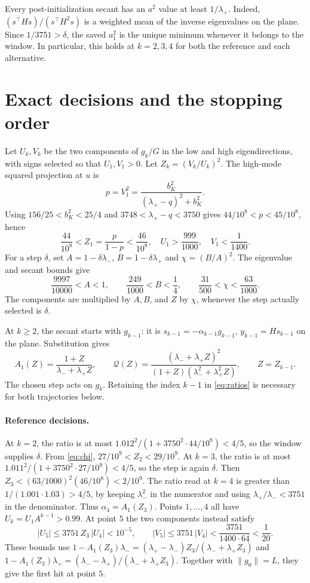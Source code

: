 \documentclass[11pt]{article}
\newcommand{\norm}[1]{\lVert#1\rVert}
\begin{document}
Every post-initialization secant has an \(a^2\) value at least
\(1/\lambda_+\). Indeed, \((s^\top Hs)/(s^\top H^2s)\) is a
weighted mean of the inverse eigenvalues on the plane.
Since \(1/3751>\delta\), the saved \(a^2_1\) is the unique
minimum whenever it belongs to the window. In particular, this
holds at \(k=2,3,4\) for both the reference and each alternative.

\section{Exact decisions and the stopping order}

Let \(U_k,V_k\) be the two components of \(g_k/G\) in the
low and high eigendirections, with signs selected so that
\(U_1,V_1>0\). Let \(Z_k=(V_k/U_k)^2\). The high-mode squared
projection at \(u\) is
\[
 p=V_1^2=\frac{b_K^2}{(\lambda_+-q)^2+b_K^2}.
\]
Using \(156/25<b_K^2<25/4\) and \(3748<\lambda_+-q<3750\)
gives \(44/10^8<p<45/10^8\), hence
\[
 \frac{44}{10^8}<Z_1=\frac{p}{1-p}<\frac{46}{10^8},
 \quad U_1>\frac{999}{1000},
 \quad V_1<\frac1{1400}.
\]
For a step \(\delta\), set \(A=1-\delta\lambda_-\),
\(B=1-\delta\lambda_+\) and \(\chi=(B/A)^2\). The eigenvalue
and secant bounds give
\[
 \frac{9997}{10000}<A<1,\qquad \frac{249}{1000}<B<\frac14,\qquad
 \frac{31}{500}<\chi<\frac{63}{1000}.
 \tag{1}\label{eq:chi}
\]
The components are multiplied by \(A,B\), and \(Z\) by \(\chi\),
whenever the step actually selected is \(\delta\).

At \(k\ge2\), the secant starts with \(g_{k-1}\): it is
\(s_{k-1}=-\alpha_{k-1}g_{k-1}\), \(y_{k-1}=Hs_{k-1}\)
on the plane. Substitution gives
\[
 A_1(Z)=\frac{1+Z}{\lambda_-+\lambda_+Z},\qquad
 \mathcal Q(Z)=
 \frac{(\lambda_-+\lambda_+Z)^2}
      {(1+Z)(\lambda_-^2+\lambda_+^2Z)},\qquad Z=Z_{k-1}.
 \tag{2}\label{eq:ratios}
\]
The chosen step acts on \(g_k\). Retaining the index \(k-1\)
in \eqref{eq:ratios} is necessary for both trajectories below.

\paragraph{Reference decisions.}
At \(k=2\), the ratio is at most
\(1.012^2/(1+3750^2\cdot44/10^8)<4/5\), so the
window supplies \(\delta\). From \eqref{eq:chi},
\(27/10^9<Z_2<29/10^9\). At \(k=3\), the ratio is at most
\(1.011^2/(1+3750^2\cdot27/10^9)<4/5\), so the step is
again \(\delta\). Then \(Z_3<(63/1000)^2(46/10^8)<2/10^9\).
The ratio read at \(k=4\) is greater than
\(1/(1.001\cdot1.03)>4/5\), by keeping \(\lambda_-^2\)
in the numerator and using \(\lambda_+/\lambda_-<3751\)
in the denominator. Thus \(\alpha_4=A_1(Z_3)\).
Points \(1,\ldots,4\) all have \(U_k=U_1A^{k-1}>0.99\).
At point \(5\) the two components instead satisfy
\[
 |U_5|\le 3751\,Z_3\,|U_4|<10^{-5},\qquad
 |V_5|\le 3751\,|V_4|
       <\frac{3751}{1400\cdot64}<\frac1{20}.
\]
These bounds use \(1-A_1(Z_3)\lambda_-
=(\lambda_+-\lambda_-)Z_3/(\lambda_-+\lambda_+Z_3)\)
and \(1-A_1(Z_3)\lambda_+
=(\lambda_--\lambda_+)/(\lambda_-+\lambda_+Z_3)\).
Together with \(\norm{g_0}=L\), they give the first hit at point \(5\).
\end{document}

